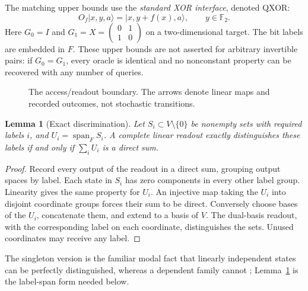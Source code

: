 \documentclass[11pt]{article}
\newtheorem{lemma}[theorem]{Lemma}
\newcommand{\F}{\mathbb F}
\DeclareMathOperator{\Span}{span}
\begin{document}
The matching upper bounds use the \emph{standard XOR interface}, denoted QXOR:
\[
 O_f\lvert x,y,a\rangle=\lvert x,y+f(x),a\rangle,
 \qquad y\in\F_2.
\]
Here $G_0=I$ and $G_1=X=\left(\begin{smallmatrix}0&1\\1&0\end{smallmatrix}\right)$ on a two-dimensional target. The bit labels are embedded in $F$. These upper bounds are not asserted for arbitrary invertible pairs: if $G_0=G_1$, every oracle is identical and no nonconstant property can be recovered with any number of queries.

\begin{figure}[ht]\centering
{}
\caption{The access/readout boundary. The arrows denote linear maps and recorded outcomes, not stochastic transitions.}\label{fig:contract}
\end{figure}

\begin{lemma}[Exact discrimination]\label{lem:discrimination}
Let $S_i\subset V\setminus\{0\}$ be nonempty sets with required labels $i$, and $U_i=\Span_F S_i$. A complete linear readout exactly distinguishes these labels if and only if $\sum_iU_i$ is a direct sum.
\end{lemma}
\begin{proof}
Record every output of the readout in a direct sum, grouping output spaces by label. Each state in $S_i$ has zero components in every other label group. Linearity gives the same property for $U_i$. An injective map taking the $U_i$ into disjoint coordinate groups forces their sum to be direct. Conversely choose bases of the $U_i$, concatenate them, and extend to a basis of $V$. The dual-basis readout, with the corresponding label on each coordinate, distinguishes the sets. Unused coordinates may receive any label.
\end{proof}
The singleton version is the familiar modal fact that linearly independent states can be perfectly distinguished, whereas a dependent family cannot \cite{Diamond2023}; Lemma~\ref{lem:discrimination} is the label-span form needed below.
\end{document}
